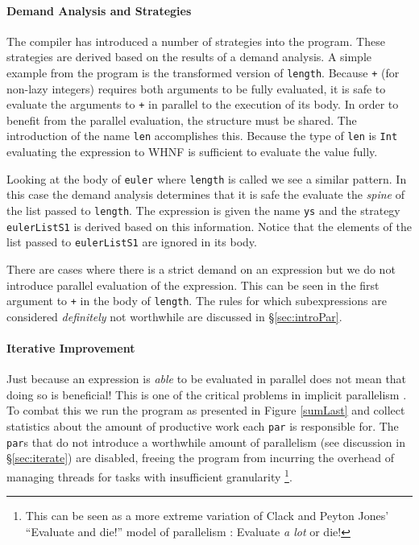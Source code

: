 \paragraph{Demand Analysis and Strategies}

The compiler has introduced a number of strategies into the program. These
strategies are derived based on the results of a demand analysis. A simple
example from the program is the transformed version of \verb-length-. Because
\verb-+- (for non-lazy integers) requires both arguments to be fully evaluated, it is safe to 
evaluate the arguments to \verb-+- in parallel to the execution of its body.
In order to benefit from the parallel evaluation, the structure must be shared.
The introduction of the name \verb-len- accomplishes this. Because the type
of \verb-len- is \verb-Int- evaluating the expression to WHNF is sufficient to
evaluate the value fully. 

Looking at the body of \verb-euler- where \verb-length- is called we see a
similar pattern. In this case the demand analysis determines that it is
safe the evaluate the \emph{spine} of the list passed to \verb-length-.
The expression is given the name \verb-ys- and the strategy \verb-eulerListS1-
is derived based on this information. Notice that the elements of the list
passed to \verb-eulerListS1- are ignored in its body. 

There are cases where there is a strict demand on an expression but we
do not introduce parallel evaluation of the expression. This can be seen
in the first argument to \verb-+- in the body of \verb-length-. The rules
for which subexpressions are considered \emph{definitely} not worthwhile
are discussed in \S\ref{sec:introPar}.

\paragraph{Iterative Improvement}

Just because an expression is \emph{able} to be evaluated in parallel does not
mean that doing so is beneficial! This is one of the critical problems in
implicit parallelism \citep{hogen1992automatic, hammond2000research,
Jones2009Tuning}. To combat this we run the program as presented in Figure
\ref{sumLast} and collect statistics about the amount of productive work
each \verb-par- is responsible for. The \verb-par-s that do not introduce
a worthwhile amount of parallelism (see discussion in \S\ref{sec:iterate})
are disabled, freeing the program from incurring the overhead of managing
threads for tasks with insufficient granularity \footnote{This can be seen
as a more extreme variation of Clack and Peyton Jones' ``Evaluate and die!''
model of parallelism \citep{clack1986four}: Evaluate \emph{a lot} or die!}.

